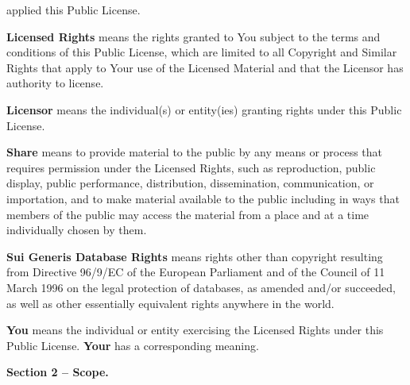 \begin{ccEnumerate}
			applied this Public License.
		\item \textbf{Licensed Rights} means the rights granted to You subject to the terms and conditions of this Public License, 
			which are limited to all Copyright and Similar Rights that apply to Your use of the Licensed Material and that 
			the Licensor has authority to license.
		\item \textbf{Licensor} means the individual(s) or entity(ies) granting rights under this Public License.
		\item \textbf{Share} means to provide material to the public by any means or process that requires permission under the 
			Licensed Rights, such as reproduction, public display, public performance, distribution, dissemination, 
			communication, or importation, and to make material available to the public including in ways that members 
			of the public may access the material from a place and at a time individually chosen by them.
		\item \textbf{Sui Generis Database Rights} means rights other than copyright resulting from Directive 96/9/EC of the 
			European Parliament and of the Council of 11 March 1996 on the legal protection of databases, as amended 
			and/or succeeded, as well as other essentially equivalent rights anywhere in the world.
		\item \textbf{You} means the individual or entity exercising the Licensed Rights under this Public License. 
			\textbf{Your} has a corresponding meaning.
	\end{ccEnumerate}
	\par \textbf{Section 2 – Scope.}
